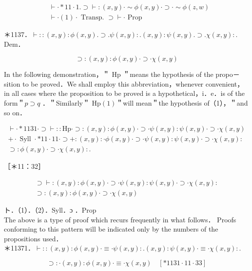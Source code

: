 \documentclass[10pt]{article}
\begin{document}
\begin{align*}
& \vdash \cdot * 11 \cdot 1 . \supset \vdash:(x, y) \cdot \sim \phi(x, y) \cdot \supset \cdot \sim \phi(z, w)  \tag{1}\\
& \vdash \cdot(1) \cdot \text { Transp. } \supset \vdash \cdot \text { Prop }
\end{align*}


＊1137．$\vdash::(x, y): \phi(x, y) . \supset . \psi(x, y): .(x, y): \psi(x, y) . \supset . \chi(x, y):$.\\
Dem．

$$
\supset:(x, y): \phi(x, y) \cdot \supset \cdot \chi(x, y)
$$

In the following demonstration，＂ Hp ＂means the hypothesis of the propo－ sition to be proved．We shall employ this abbreviation，whenever convenient， in all cases where the proposition to be proved is a hypothetical，i．e．is of the form＂$p \supset q$ ．＂Similarly＂ $\mathrm{Hp}(1)$＂will mean＂the hypothesis of（1），＂and so on．

\[
\begin{array}{r}
\vdash \cdot * 1131 \cdot \supset \vdash:: \mathrm{Hp} \cdot \supset:(x, y): \phi(x, y) \cdot \supset \cdot \psi(x, y): \psi(x, y) \cdot \supset \cdot \chi(x, y)  \tag{1}\\
+\cdot \text { Syll } \cdot * 11 \cdot 11 \cdot \supset+:(x, y): \cdot \phi(x, y) \cdot \supset \cdot \psi(x, y): \psi(x, y) \cdot \supset \cdot \chi(x, y): \\
\supset: \phi(x, y) \cdot \supset \cdot \chi(x, y): .
\end{array}
\]

［＊11：32］

\[
\begin{array}{r}
\supset \vdash:(x, y): \phi(x, y) \cdot \supset \cdot \psi(x, y): \psi(x, y) \cdot \supset \cdot \chi(x, y): \\
\supset:(x, y): \phi(x, y) \cdot \supset \cdot \chi(x, y) \tag{2}
\end{array}
\]

ト．（1）．（2）．Syll．ɔ ．Prop\\
The above is a type of proof which recurs frequently in what follows． Proofs conforming to this pattern will be indicated only by the numbers of the propositions used．\\
＊11371．$\vdash::(x, y): \phi(x, y) \cdot \equiv \cdot \psi(x, y): .(x, y): \psi(x, y) \cdot \equiv \cdot \chi(x, y):$.

$$
\supset: \cdot(x, y): \phi(x, y) \cdot \equiv \cdot \chi(x, y) \quad[* 1131 \cdot 11 \cdot 33]
$$
\end{document}
